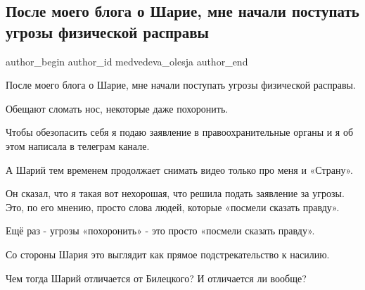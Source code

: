  
 
 
 
 
 
\subsection{После моего блога о Шарие, мне начали поступать угрозы физической расправы}
\label{sec:19_08_2021.fb.medvedeva_olesja.1.sharij}
 
\ifcmt
 author_begin
   author_id medvedeva_olesja
 author_end
\fi

После моего блога о Шарие, мне начали поступать угрозы физической расправы. 

Обещают сломать нос, некоторые даже похоронить.

Чтобы обезопасить себя я подаю заявление в правоохранительные органы и я об
этом написала в телеграм канале.

А Шарий тем временем продолжает снимать видео только про меня и «Страну». 

Он сказал, что я такая вот нехорошая, что решила  подать заявление за угрозы.
Это, по его мнению, просто слова людей, которые «посмели сказать правду».

Ещё раз - угрозы «похоронить» - это просто «посмели сказать правду». 

Со стороны Шария это выглядит как прямое подстрекательство к насилию.

Чем тогда Шарий отличается от Билецкого? И отличается ли вообще?

